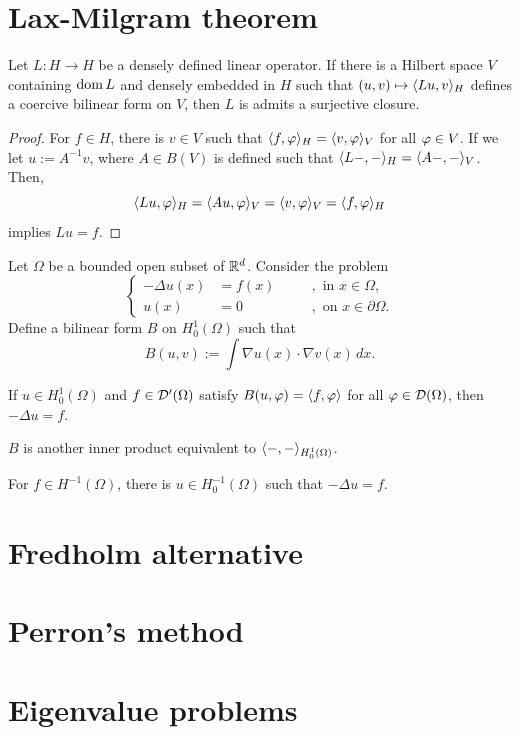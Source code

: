 \documentclass{../../large}
\begin{document}
\section{Lax-Milgram theorem}
\begin{prb}
Let $L:H\to H$ be a densely defined linear operator.
If there is a Hilbert space $V$ containing $\operatorname{dom} L$ and densely embedded in $H$ such that $(u,v)\mapsto\langle Lu,v\rangle_H$ defines a coercive bilinear form on $V$, then $L$ is admits a surjective closure.
\end{prb}
\begin{proof}
For $f\in H$, there is $v\in V$ such that $\langle f,\varphi\rangle_H=\langle v,\varphi\rangle_V$ for all $\varphi\in V$.
If we let $u:=A^{-1}v$, where $A\in B(V)$ is defined such that $\langle L-,-\rangle_H=\langle A-,-\rangle_V$.
Then,
\[\langle Lu,\varphi\rangle_H=\langle Au,\varphi\rangle_V=\langle v,\varphi\rangle_V=\langle f,\varphi\rangle_H\]
implies $Lu=f$.
\end{proof}

\begin{prb}
Let $\Omega$ be a bounded open subset of $\mathbb{R}^d$.
Consider the problem
\[\left\{\begin{alignedat}{2}
-\Delta u(x)&=f(x)&\quad&,\text{ in }x\in\Omega,\\
u(x)&=0&&,\text{ on }x\in\partial\Omega.
\end{alignedat}\right.\]
Define a bilinear form $B$ on $H_0^1(\Omega)$ such that
\[B(u,v):=\int\nabla u(x)\cdot\nabla v(x)\,dx.\]
\begin{parts}
\item If $u\in H_0^1(\Omega)$ and $f\in\mathcal{D}'(\Omega)$ satisfy $B(u,\varphi)=\langle f,\varphi\rangle$ for all $\varphi\in\mathcal{D}(\Omega)$, then $-\Delta u=f$.
\item $B$ is another inner product equivalent to $\langle-,-\rangle_{H_0^1(\Omega)}$.
\item For $f\in H^{-1}(\Omega)$, there is $u\in H_0^{-1}(\Omega)$ such that $-\Delta u=f$.
\end{parts}
\end{prb}

\section{Fredholm alternative}

\section{Perron's method}

\section{Eigenvalue problems}
\end{document}
